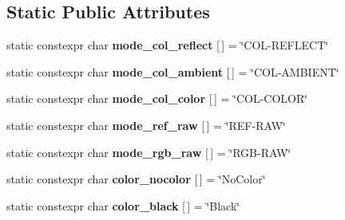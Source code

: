 \subsection*{Static Public Attributes}
\begin{DoxyCompactItemize}
\item 
\mbox{\label{classev3dev_1_1color__sensor_a8d54da5ca5b5c3b51220fc0a35d89e33}} 
static constexpr char {\bfseries mode\+\_\+col\+\_\+reflect} \mbox{[}$\,$\mbox{]} = \char`\"{}C\+OL-\/R\+E\+F\+L\+E\+CT\char`\"{}
\item 
\mbox{\label{classev3dev_1_1color__sensor_ac6d5a3879340faf39a1f670748b35f34}} 
static constexpr char {\bfseries mode\+\_\+col\+\_\+ambient} \mbox{[}$\,$\mbox{]} = \char`\"{}C\+OL-\/A\+M\+B\+I\+E\+NT\char`\"{}
\item 
\mbox{\label{classev3dev_1_1color__sensor_aae39c8eccf0a6e476332af9964b921bc}} 
static constexpr char {\bfseries mode\+\_\+col\+\_\+color} \mbox{[}$\,$\mbox{]} = \char`\"{}C\+OL-\/C\+O\+L\+OR\char`\"{}
\item 
\mbox{\label{classev3dev_1_1color__sensor_a0cec02be6275dbf3271b223e1a05044a}} 
static constexpr char {\bfseries mode\+\_\+ref\+\_\+raw} \mbox{[}$\,$\mbox{]} = \char`\"{}R\+EF-\/R\+AW\char`\"{}
\item 
\mbox{\label{classev3dev_1_1color__sensor_a5c0b440d72d59e5aa340feb233df0189}} 
static constexpr char {\bfseries mode\+\_\+rgb\+\_\+raw} \mbox{[}$\,$\mbox{]} = \char`\"{}R\+GB-\/R\+AW\char`\"{}
\item 
\mbox{\label{classev3dev_1_1color__sensor_a446bab842ed36fd9056ad66d6f9a4d1d}} 
static constexpr char {\bfseries color\+\_\+nocolor} \mbox{[}$\,$\mbox{]} = \char`\"{}No\+Color\char`\"{}
\item 
\mbox{\label{classev3dev_1_1color__sensor_adc87e18166cfa2c5abc2260641faed95}} 
static constexpr char {\bfseries color\+\_\+black} \mbox{[}$\,$\mbox{]} = \char`\"{}Black\char`\"{}
\item 
\mbox{\label{classev3dev_1_1color__sensor_ac8be9ca9ba06ea8eca1eaf69a2df4bde}} 

\end{DoxyCompactItemize}
